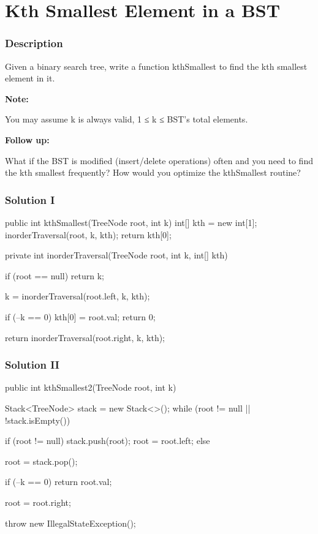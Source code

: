 \newpage

\section{Kth Smallest Element in a BST} %

\subsubsection{Description}
Given a binary search tree, write a function kthSmallest to find the kth smallest element in it.

\textbf{Note:}

You may assume k is always valid, 1 ≤ k ≤ BST's total elements.

\textbf{Follow up:}

What if the BST is modified (insert/delete operations) often and you need to find the kth smallest frequently? How would you optimize the kthSmallest routine?

\subsubsection{Solution I}

\begin{Code}
public int kthSmallest(TreeNode root, int k) {
    int[] kth = new int[1];
    inorderTraversal(root, k, kth);
    return kth[0];
}

private int inorderTraversal(TreeNode root, int k, int[] kth) {
    if (root == null) {
        return k;
    }

    k = inorderTraversal(root.left, k, kth);

    if (--k == 0) {
        kth[0] = root.val;
        return 0;
    }

    return inorderTraversal(root.right, k, kth);
}
\end{Code}

\subsubsection{Solution II}

\begin{Code}
public int kthSmallest2(TreeNode root, int k) {
    Stack<TreeNode> stack = new Stack<>();
    while (root != null || !stack.isEmpty()) {
        if (root != null) {
            stack.push(root);
            root = root.left;
        } else {
            root = stack.pop();

            if (--k == 0) {
                return root.val;
            }

            root = root.right;
        }
    }
    throw new IllegalStateException();
}
\end{Code}

